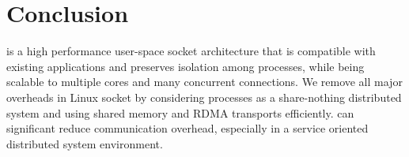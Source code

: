 \section{Conclusion}
\label{sec:conclusion}

\sys is a high performance user-space socket architecture that is compatible with existing applications and preserves isolation among processes, while being scalable to multiple cores and many concurrent connections. We remove all major overheads in Linux socket by considering processes as a share-nothing distributed system and using shared memory and RDMA transports efficiently. \sys can significant reduce communication overhead, especially in a service oriented distributed system environment. 